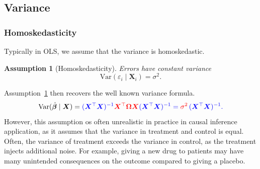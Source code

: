 \documentclass[11pt]{exam}
\theoremstyle{plain}
\newtheorem{assumption}{Assumption}
\newcommand{\bX}{\bm{X}}
\newcommand{\Var}{\mathrm{Var}}
\begin{document}
\subsection{Variance}
\subsubsection{Homoskedasticity}
Typically in OLS, we assume that the variance is homoskedastic.
\begin{assumption}[Homoskedasticity]\label{ass:homoskedasticity}
    Errors have constant variance  
  \[
  \Var(\varepsilon_i \mid \bX_i) = \sigma^2.
  \]
\end{assumption}

Assumption~\ref{ass:homoskedasticity} then recovers the well known variance formula.
\[
  \Var(\hat{\bm{\beta}} \mid \bX)
  = \color{blue}{(\bX^\top \bX)^{-1}}
    \color{red}{\bX^\top \bm{\Omega} \bX}
    \color{blue}{(\bX^\top \bX)^{-1}}
  = \color{red}{\sigma^2}\,\color{blue}{(\bX^\top \bX)^{-1}}.
  \]
However, this assumption os often unrealistic in practice in causal inference application, as it assumes that the variance in treatment and control is equal. Often, the variance of treatment exceeds the variance in control, as the treatment injects additional noise. For example, giving a new drug to patients may have many unintended consequences on the outcome compared to giving a placebo. 
\end{document}
